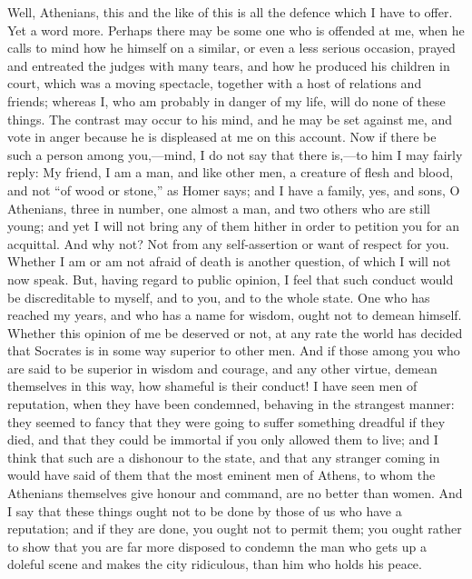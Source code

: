 \documentclass[11pt,letter]{article}
\begin{document}
\par  Well, Athenians, this and the like of this is all the defence which I have to offer. Yet a word more. Perhaps there may be some one who is offended at me, when he calls to mind how he himself on a similar, or even a less serious occasion, prayed and entreated the judges with many tears, and how he produced his children in court, which was a moving spectacle, together with a host of relations and friends; whereas I, who am probably in danger of my life, will do none of these things. The contrast may occur to his mind, and he may be set against me, and vote in anger because he is displeased at me on this account. Now if there be such a person among you,—mind, I do not say that there is,—to him I may fairly reply: My friend, I am a man, and like other men, a creature of flesh and blood, and not “of wood or stone,” as Homer says; and I have a family, yes, and sons, O Athenians, three in number, one almost a man, and two others who are still young; and yet I will not bring any of them hither in order to petition you for an acquittal. And why not? Not from any self-assertion or want of respect for you. Whether I am or am not afraid of death is another question, of which I will not now speak. But, having regard to public opinion, I feel that such conduct would be discreditable to myself, and to you, and to the whole state. One who has reached my years, and who has a name for wisdom, ought not to demean himself. Whether this opinion of me be deserved or not, at any rate the world has decided that Socrates is in some way superior to other men. And if those among you who are said to be superior in wisdom and courage, and any other virtue, demean themselves in this way, how shameful is their conduct! I have seen men of reputation, when they have been condemned, behaving in the strangest manner: they seemed to fancy that they were going to suffer something dreadful if they died, and that they could be immortal if you only allowed them to live; and I think that such are a dishonour to the state, and that any stranger coming in would have said of them that the most eminent men of Athens, to whom the Athenians themselves give honour and command, are no better than women. And I say that these things ought not to be done by those of us who have a reputation; and if they are done, you ought not to permit them; you ought rather to show that you are far more disposed to condemn the man who gets up a doleful scene and makes the city ridiculous, than him who holds his peace.
\end{document}

